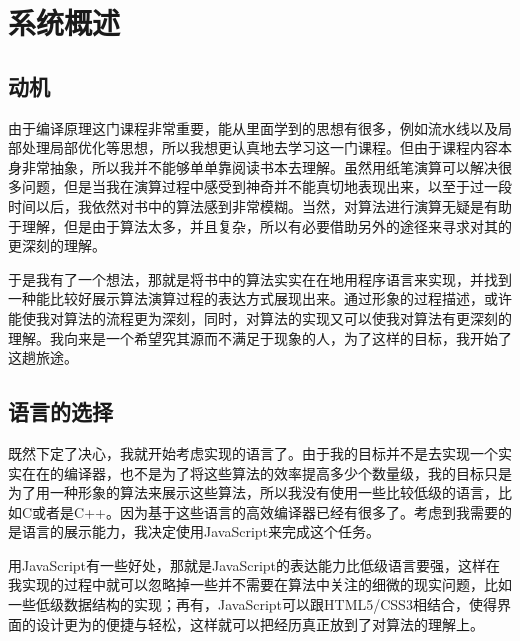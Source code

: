 \chapter{系统概述}

\section{动机}

由于编译原理这门课程非常重要，能从里面学到的思想有很多，例如流水线以及局部处理局部优化等思想，所以我想更认真地去学习这一门课程。但由于课程内容本身非常抽象，所以我并不能够单单靠阅读书本去理解。虽然用纸笔演算可以解决很多问题，但是当我在演算过程中感受到神奇并不能真切地表现出来，以至于过一段时间以后，我依然对书中的算法感到非常模糊。当然，对算法进行演算无疑是有助于理解，但是由于算法太多，并且复杂，所以有必要借助另外的途径来寻求对其的更深刻的理解。

于是我有了一个想法，那就是将书中的算法实实在在地用程序语言来实现，并找到一种能比较好展示算法演算过程的表达方式展现出来。通过形象的过程描述，或许能使我对算法的流程更为深刻，同时，对算法的实现又可以使我对算法有更深刻的理解。我向来是一个希望究其源而不满足于现象的人，为了这样的目标，我开始了这趟旅途。

\section{语言的选择}

既然下定了决心，我就开始考虑实现的语言了。由于我的目标并不是去实现一个实实在在的编译器，也不是为了将这些算法的效率提高多少个数量级，我的目标只是为了用一种形象的算法来展示这些算法，所以我没有使用一些比较低级的语言，比如C或者是C++。因为基于这些语言的高效编译器已经有很多了。考虑到我需要的是语言的展示能力，我决定使用JavaScript来完成这个任务。

用JavaScript有一些好处，那就是JavaScript的表达能力比低级语言要强，这样在我实现的过程中就可以忽略掉一些并不需要在算法中关注的细微的现实问题，比如一些低级数据结构的实现；再有，JavaScript可以跟HTML5/CSS3相结合，使得界面的设计更为的便捷与轻松，这样就可以把经历真正放到了对算法的理解上。
